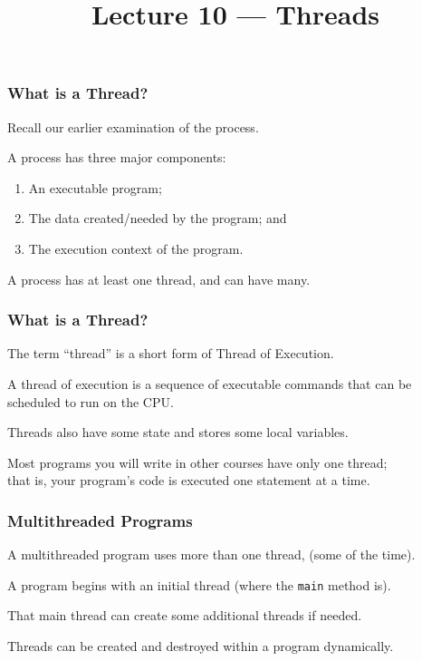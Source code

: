 

\title{Lecture 10 --- Threads}





\begin{frame}
	\titlepage

\end{frame}

\begin{frame}
	\frametitle{What is a Thread?}


	Recall our earlier examination of the process.

	A process has three major components:
	\begin{enumerate}
		\item An executable program;
		\item The data created/needed by the program; and
		\item The execution context of the program.
	\end{enumerate}

	A process has at least one \alert{thread}, and can have many.

\end{frame}

\begin{frame}
	\frametitle{What is a Thread?}

	The term ``thread'' is a short form of \alert{Thread of Execution}.

	A thread of execution is a sequence of executable commands that can be scheduled to run on the CPU.

	Threads also have some state and stores some local variables.

	Most programs you will write in other courses have only one thread;\\
	\quad that is, your program's code is executed one statement at a time.

\end{frame}

\begin{frame}
	\frametitle{Multithreaded Programs}

	A multithreaded program uses more than one thread, (some of the time).

	A program begins with an initial thread (where the \texttt{main} method is).

	That main thread can create some additional threads if needed.

	Threads can be created and destroyed within a program dynamically.

\end{frame}

